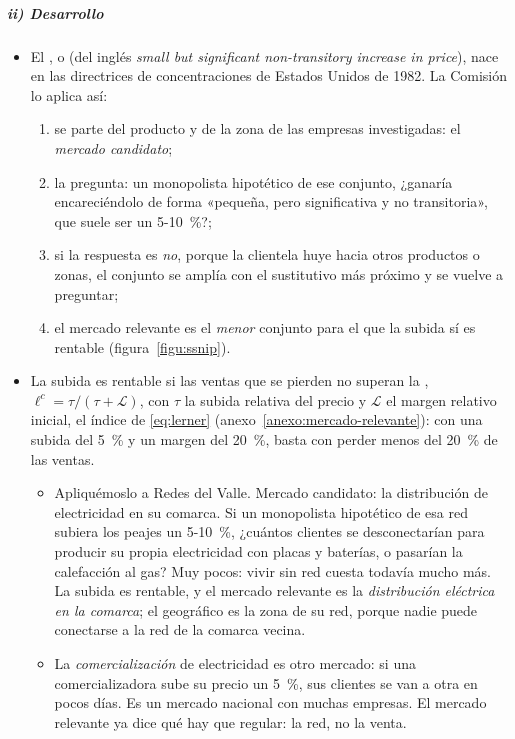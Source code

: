 \documentclass[11pt]{article}
\begin{document}
\subparagraph{ii) Desarrollo}

\begin{itemize}
\item El , o  (del inglés \emph{small but significant non-transitory increase in price}), nace en las directrices de concentraciones de Estados Unidos de 1982\nocite{DOJ1982Merger}. La Comisión lo aplica así\nocite{CE2024DefinicionMercado}:
  \begin{enumerate}
  \item se parte del producto y de la zona de las empresas investigadas: el \emph{mercado candidato};
  \item la pregunta: un monopolista hipotético de ese conjunto, ¿ganaría encareciéndolo de forma «pequeña, pero significativa y no transitoria», que suele ser un 5-10~\%?;
  \item si la respuesta es \emph{no}, porque la clientela huye hacia otros productos o zonas, el conjunto se amplía con el sustitutivo más próximo y se vuelve a preguntar;
  \item el mercado relevante es el \emph{menor} conjunto para el que la subida sí es rentable (figura~\ref{figu:ssnip}).
  \end{enumerate}
\item La subida es rentable si las ventas que se pierden no superan la , $\ell^{c}=\tau/(\tau+\mathcal{L})$, con $\tau$ la subida relativa del precio y $\mathcal{L}$ el margen relativo inicial, el índice de  \eqref{eq:lerner}\nocite{HarrisSimons1989Focusing} (anexo~\ref{anexo:mercado-relevante}): con una subida del 5~\% y un margen del 20~\%, basta con perder menos del 20~\% de las ventas.
  \begin{itemize}
  \item Apliquémoslo a Redes del Valle. Mercado candidato: la distribución de electricidad en su comarca. Si un monopolista hipotético de esa red subiera los peajes un 5-10~\%, ¿cuántos clientes se desconectarían para producir su propia electricidad con placas y baterías, o pasarían la calefacción al gas? Muy pocos: vivir sin red cuesta todavía mucho más. La subida es rentable, y el mercado relevante es la \emph{distribución eléctrica en la comarca}; el geográfico es la zona de su red, porque nadie puede conectarse a la red de la comarca vecina.
  \item La \emph{comercialización} de electricidad es otro mercado: si una comercializadora sube su precio un 5~\%, sus clientes se van a otra en pocos días. Es un mercado nacional con muchas empresas. El mercado relevante ya dice qué hay que regular: la red, no la venta.
  \end{itemize}
\end{itemize}
\end{document}
